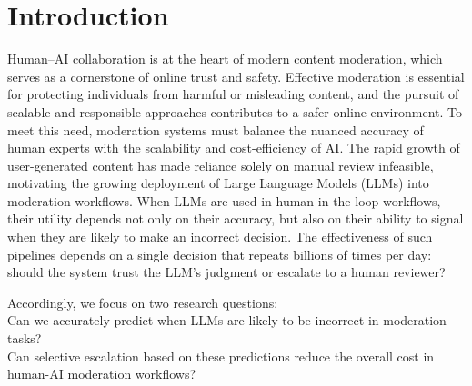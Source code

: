 \section{Introduction}

Human–AI collaboration is at the heart of modern content moderation, which serves as a cornerstone of online trust and safety. Effective moderation is essential for protecting individuals from harmful or misleading content, and the pursuit of scalable and responsible approaches contributes to a safer online environment. To meet this need, moderation systems must balance the nuanced accuracy of human experts with the scalability and cost-efficiency of AI. The rapid growth of user-generated content has made reliance solely on manual review infeasible, motivating the growing deployment of Large Language Models (LLMs) into moderation workflows. When LLMs are used in human-in-the-loop workflows, their utility depends not only on their accuracy, but also on their ability to signal when they are likely to make an incorrect decision.  The effectiveness of such pipelines depends on a single decision that repeats billions of times per day: should the system trust the LLM's judgment or escalate to a human reviewer?

Accordingly, we focus on two research questions:\\
\noindent {} Can we accurately predict when LLMs are likely to be incorrect in moderation tasks? \\
\noindent {} Can selective escalation based on these predictions reduce the overall cost in human-AI moderation workflows?

